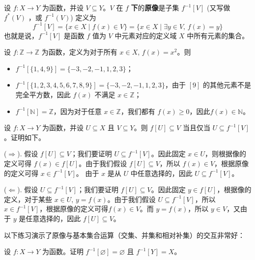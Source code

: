 \begin{definition}
\label{defPreimage}
设 $f : X \to Y$ 为函数，并设 $V \subseteq Y$。$V$ 在 $f$ \textbf{下}的\textbf{原像}是子集 $f^{-1}[V]$  (又写做 $f^*(V)$ ，或 $f^{-1}(V)$) 定义为
\[ f^{-1}[V] = \{ x \in X \mid f(x) \in V \} = \{ x \in X \mid \exists y \in V,\, f(x) = y \} \]
也就是说，$f^{-1}[V]$ 是函数 $f$ 值为 $V$ 中元素对应的定义域 $X$ 中所有元素的集合。
\end{definition}

\begin{example}
设 $f : \mathbb{Z} \to \mathbb{Z}$ 为函数，定义为对于所有 $x \in X$, $f(x)=x^2$。则
\begin{itemize}
\item $f^{-1}[ \{ 1, 4, 9 \} ] = \{ -3, -2, -1, 1, 2, 3 \}$；
\item $f^{-1}[ \{ 1, 2, 3, 4, 5, 6, 7, 8, 9 \} ] =  \{ -3, -2, -1, 1, 2, 3 \}$，由于 $[9]$ 的其他元素不是完全平方数，因此 $f(x)$ 不满足 $x \in \mathbb{Z}$；
\item $f^{-1}[\mathbb{N}] = \mathbb{Z}$，因为对于任意 $x \in \mathbb{Z}$，我们都有 $f(x) \ge 0$，因此$f(x) \in \mathbb{N}$。
\end{itemize}
\end{example}

\begin{example}
设 $f : X \to Y$ 为函数，并设 $U \subseteq X$ 且 $V \subseteq Y$。则 $f[U] \subseteq V$ 当且仅当 $U \subseteq f^{-1}[V]$。证明如下。

($\Rightarrow$). 假设 $f[U] \subseteq V$；我们要证明 $U \subseteq f^{-1}[V]$。因此固定 $x \in U$，则根据像的定义可得 $f(x) \in f[U]$。由于我们假设 $f[U] \subseteq V$，所以 $f(x) \in V$，根据原像的定义可得 $x \in f^{-1}[V]$。 
由于 $x$ 是从 $U$ 中任意选择的，因此 $U \subseteq f^{-1}[V]$。

($\Leftarrow$). 假设 $U \subseteq f^{-1}[V]$；我们要证明 $f[U] \subseteq V$。因此固定 $y \in f[U]$，根据像的定义，对于某些 $x \in U$, $y=f(x)$。由于我们假设 $U \subseteq f^{-1}[V]$，所以 $x \in f^{-1}[V]$，根据原像的定义可得$f(x) \in V$。而 $y=f(x)$，所以 $y \in V$，又由于 $y$ 是任意选择的，因此 $f[U] \subseteq V$。
\end{example}

以下练习演示了原像与基本集合运算（交集、并集和相对补集）的交互非常好：

\begin{exercise}
设 $f : X \to Y$ 为函数。证明 $f^{-1}[\varnothing] = \varnothing$ 且 $f^{-1}[Y]=X$。
\end{exercise}

